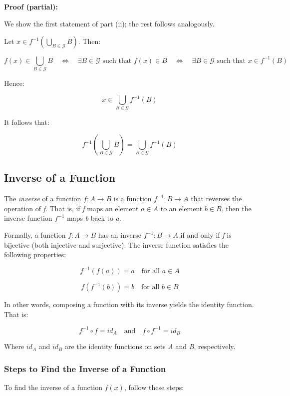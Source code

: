 \textbf{Proof (partial):}

We show the first statement of part (ii); the rest follows analogously.

Let \( x \in f^{-1} \left( \bigcup_{B \in \mathcal{G}} B \right) \). Then:

\[
	f(x) \in \bigcup_{B \in \mathcal{G}} B
	\quad \Leftrightarrow \quad
	\exists B \in \mathcal{G} \text{ such that } f(x) \in B
	\quad \Leftrightarrow \quad
	\exists B \in \mathcal{G} \text{ such that } x \in f^{-1}(B)
\]

Hence:

\[
	x \in \bigcup_{B \in \mathcal{G}} f^{-1}(B)
\]

It follows that:

\[
	f^{-1} \left( \bigcup_{B \in \mathcal{G}} B \right) = \bigcup_{B \in \mathcal{G}} f^{-1}(B)
\]

\QED

\subsection{Inverse of a Function}

The \emph{inverse} of a function \(f: A \to B\) is a function \(f^{-1}: B \to A\) that 
reverses the operation of \emph{f}. That is, if \emph{f} maps an element \(a \in A\) to an 
element \(b \in B\), then the inverse function \(f^{-1}\) maps \emph{b} back to \emph{a}.

Formally, a function \(f: A \to B\) has an inverse \(f^{-1}: B \to A\)  
if and only if \emph{f} is bijective (both injective and surjective). The inverse function satisfies the 
following properties:

\[
	f^{-1}(f(a)) = a \quad \text{for all } a \in A
\]

\[
	f(f^{-1}(b)) = b \quad \text{for all } b \in B
\]

In other words, composing a function with its inverse yields the identity function. That is:

\[
	f^{-1} \circ f = id_A \quad \text{and} \quad f \circ f^{-1} = id_B
\]

Where \(id_A\) and \(id_B\) are the identity functions on sets \emph{A} and \emph{B}, respectively.

\subsubsection{Steps to Find the Inverse of a Function}

To find the inverse of a function \(f (x)\), follow these steps:

